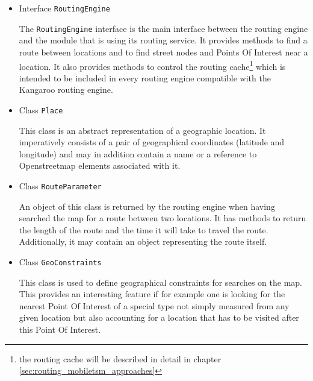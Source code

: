 \begin{itemize}

	\item Interface \texttt{RoutingEngine}
	
		The \texttt{RoutingEngine} interface is the main interface between the routing engine and the module that is using its routing service. It provides methods to find a route between locations and to find street nodes and Points Of Interest near a location. It also provides methods to control the routing cache\footnote{the routing cache will be described in detail in chapter \ref{sec:routing_mobiletsm_approaches}} which is intended to be included in every routing engine compatible with the Kangaroo routing engine.
		
	\item Class \texttt{Place}
	
		This class is an abstract representation of a geographic location. It imperatively consists of a pair of geographical coordinates (latitude and longitude) and may in addition contain a name or a reference to Openstreetmap elements associated with it.
	
	\item Class \texttt{RouteParameter}
	
		An object of this class is returned by the routing engine when having searched the map for a route between two locations. It has methods to return the length of the route and the time it will take to travel the route. Additionally, it may contain an object representing the route itself.	
	
	\item Class \texttt{GeoConstraints}
	
		This class is used to define geographical constraints for searches on the map. This provides an interesting feature if for example one is looking for the nearest Point Of Interest of a special type not simply measured from any given location but also accounting for a location that has to be visited after this Point Of Interest.

\end{itemize}

